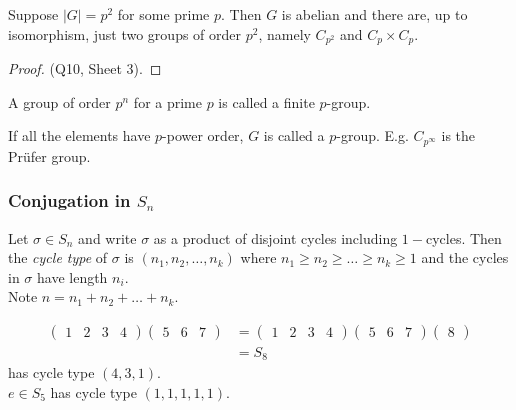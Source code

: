 \begin{corollary}\label{cor:5}
    Suppose $|G| = p^2$ for some prime $p$.
    Then $G$ is abelian and there are, up to isomorphism, just two groups of order $p^2$, namely $C_{p^2}$ and $C_p \times C_p$.
\end{corollary}  

\begin{proof}
    (Q10, Sheet 3).
\end{proof} 

\begin{remark} \mbox{}
    \item A group of order $p^n$ for a prime $p$ is called a finite $p$-group.
    \item If all the elements have $p$-power order, $G$ is called a $p$-group.
    E.g. $C_{p^\infty}$ is the Pr\"ufer group.
\end{remark} 

\subsubsection{Conjugation in $S_n$}

\begin{definition} \label{def:20}
    Let $\sigma \in S_n$ and write $\sigma$ as a product of disjoint cycles including $1-$cycles.
    Then the \emph{cycle type} of $\sigma$ is $(n_1, n_2, \ldots, n_k)$ where $n_1 \geq n_2 \geq \ldots \geq n_k \geq 1$ and the cycles in $\sigma$ have length $n_i$. \\
    Note $n = n_1 + n_2 + \ldots + n_k$.
\end{definition} 

\begin{example}
    \begin{align*}
        \begin{pmatrix}1 & 2 & 3 & 4\end{pmatrix} \begin{pmatrix}5 & 6 & 7\end{pmatrix} &= \begin{pmatrix}1 & 2 & 3 & 4\end{pmatrix} \begin{pmatrix}5 & 6 & 7\end{pmatrix} \begin{pmatrix}8\end{pmatrix} \\
        &= S_8
    \end{align*}
    has cycle type $(4, 3, 1)$. \\
    $e \in S_5$ has cycle type $(1, 1, 1, 1, 1)$.
\end{example} 


